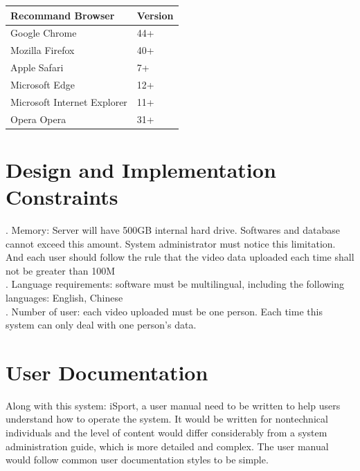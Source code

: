 \documentclass[16pt]{scrreprt}
\begin{document}
 
\begin{center}
    \begin{tabular}{p{7cm}p{7cm}}
        \hline
	    Recommand Browser & Version\\
        \hline
	    Google Chrome &  44+\\
        \hline
	    Mozilla Firefox & 40+\\
        \hline
        Apple Safari & 7+\\
        \hline
        Microsoft Edge & 12+\\
        \hline
        Microsoft Internet Explorer & 11+\\
        \hline
        Opera Opera & 31+\\
        \hline

 
    \end{tabular}
\end{center}

 
\section{Design and Implementation Constraints}

 
. Memory: Server will have 500GB internal hard drive. Softwares and database cannot exceed this amount. System administrator must notice this limitation. And each user should follow the rule that the video data uploaded each time shall not be greater than 100M\\

 
. Language requirements: software must be multilingual, including the following languages: English, Chinese\\

 
. Number of user: each video uploaded must be one person. Each time this system can only deal with one person's data.\\

 
\section{User Documentation}

 
Along with this system: iSport, a user manual need to be written to help users understand how to operate the system. It would be written for nontechnical individuals and the level of content would differ considerably from a system administration guide, which is more detailed and complex. The user manual would follow common user documentation styles to be simple.\\
\end{document}
